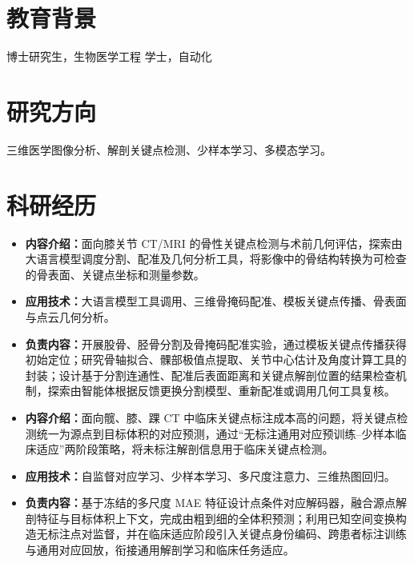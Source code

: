 \documentclass{resume}
\begin{document}

\section{教育背景}
博士研究生，生物医学工程
学士，自动化

\section{研究方向}
三维医学图像分析、解剖关键点检测、少样本学习、多模态学习。

\section{科研经历}
\begin{itemize}
\item \textbf{内容介绍：}面向膝关节 CT/MRI 的骨性关键点检测与术前几何评估，探索由大语言模型调度分割、配准及几何分析工具，将影像中的骨结构转换为可检查的骨表面、关键点坐标和测量参数。
\item \textbf{应用技术：}大语言模型工具调用、三维骨掩码配准、模板关键点传播、骨表面与点云几何分析。
\item \textbf{负责内容：}开展股骨、胫骨分割及骨掩码配准实验，通过模板关键点传播获得初始定位；研究骨轴拟合、髁部极值点提取、关节中心估计及角度计算工具的封装；设计基于分割连通性、配准后表面距离和关键点解剖位置的结果检查机制，探索由智能体根据反馈更换分割模型、重新配准或调用几何工具复核。
\end{itemize}

\begin{itemize}
\item \textbf{内容介绍：}面向髋、膝、踝 CT 中临床关键点标注成本高的问题，将关键点检测统一为源点到目标体积的对应预测，通过“无标注通用对应预训练--少样本临床适应”两阶段策略，将未标注解剖信息用于临床关键点检测。
\item \textbf{应用技术：}自监督对应学习、少样本学习、多尺度注意力、三维热图回归。
\item \textbf{负责内容：}基于冻结的多尺度 MAE 特征设计点条件对应解码器，融合源点解剖特征与目标体积上下文，完成由粗到细的全体积预测；利用已知空间变换构造无标注点对监督，并在临床适应阶段引入关键点身份编码、跨患者标注训练与通用对应回放，衔接通用解剖学习和临床任务适应。
\end{itemize}
\end{document}
